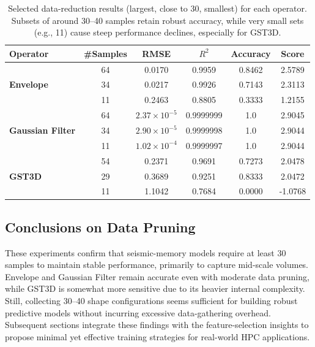 \begin{table}[htbp]
    \centering
    \begin{tabular}{lccccc}
        \hline
        \textbf{Operator} & \textbf{\#Samples} & \textbf{\ac{RMSE}}    & \textbf{$R^2$} & \textbf{Accuracy} & \textbf{Score} \\
        \hline
        \multirow{3}{*}{\textbf{Envelope}}
        & 64                 & 0.0170                & 0.9959         & 0.8462            & 2.5789         \\
        & 34                 & 0.0217                & 0.9926         & 0.7143            & 2.3113         \\
        & 11                 & 0.2463                & 0.8805         & 0.3333            & 1.2155         \\
        \hline
        \multirow{3}{*}{\textbf{Gaussian Filter}}
        & 64                 & \(2.37\times10^{-5}\) & 0.9999999      & 1.0               & 2.9045         \\
        & 34                 & \(2.90\times10^{-5}\) & 0.9999998      & 1.0               & 2.9044         \\
        & 11                 & \(1.02\times10^{-4}\) & 0.9999997      & 1.0               & 2.9044         \\
        \hline
        \multirow{3}{*}{\textbf{\ac{GST3D}}}
        & 54                 & 0.2371                & 0.9691         & 0.7273            & 2.0478         \\
        & 29                 & 0.3689                & 0.9251         & 0.8333            & 2.0472         \\
        & 11                 & 1.1042                & 0.7684         & 0.0000            & -1.0768        \\
        \hline
    \end{tabular}
    \caption{Selected data-reduction results (largest, close to 30, smallest) for each operator.
    Subsets of around 30--40 samples retain robust accuracy, while very small sets
        (e.g., 11) cause steep performance declines, especially for \ac{GST3D}.}
    \label{tab:data_reduction_small_vs_medium_vs_large}
\end{table}

\subsection{Conclusions on Data Pruning}
\label{subsec:data-reduction-conclusions}

These experiments confirm that seismic-memory models require at least 30 samples to maintain stable performance, primarily to capture mid-scale volumes.
Envelope and Gaussian Filter remain accurate even with moderate data pruning, while \ac{GST3D} is somewhat more sensitive due to its heavier internal complexity.
Still, collecting 30–40 shape configurations seems sufficient for building robust predictive models without incurring excessive data-gathering overhead.
Subsequent sections integrate these findings with the feature-selection insights to propose minimal yet effective training strategies for real-world \ac{HPC} applications.
